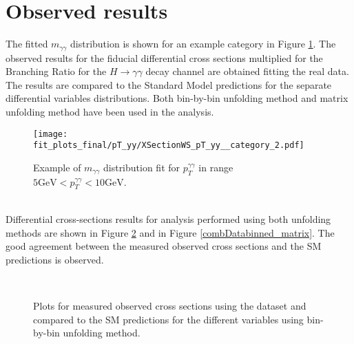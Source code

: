 \section{Observed results}
The fitted $m_{\gamma\gamma}$ distribution is shown for an example category in Figure \ref{fit_example}. The observed results for the fiducial differential cross sections multiplied for the Branching Ratio for the $H \rightarrow \gamma\gamma$ decay channel are obtained fitting the real data. The results are compared to the Standard Model predictions for the separate differential variables distributions. Both bin-by-bin unfolding method and matrix unfolding method have been used in the analysis.
\begin{figure}[t]
\centering
\texttt{[image: fit\_plots\_final/pT\_yy/XSectionWS\_pT\_yy\_\_category\_2.pdf]}
\caption{Example of $m_{\gamma\gamma}$ distribution fit for $p_T^{\gamma\gamma}$ in range $5\text{GeV} < p_T^{\gamma\gamma} < 10 \text{GeV}$.}
\label{fit_example}
\end{figure}
\\Differential cross-sections results for analysis performed using both unfolding methods are shown in Figure \ref{combDatabinned_bin-by-bin} and in Figure \ref{combDatabinned_matrix}. The good agreement between the measured observed cross sections and the SM predictions is observed.
\begin{figure}[htb]
\centering
{} \qquad
{} \\
 \qquad
{}
\end{figure}
\begin{figure}[htb]
\centering
{} \qquad
{}
\caption{Plots for measured observed cross sections using the dataset and compared to the SM predictions for the different variables using bin-by-bin unfolding method.}
\label{combDatabinned_bin-by-bin}
\end{figure}
\begin{figure}[H]
\centering
{} \qquad
{} \\
 \qquad 
{}
\end{figure}
